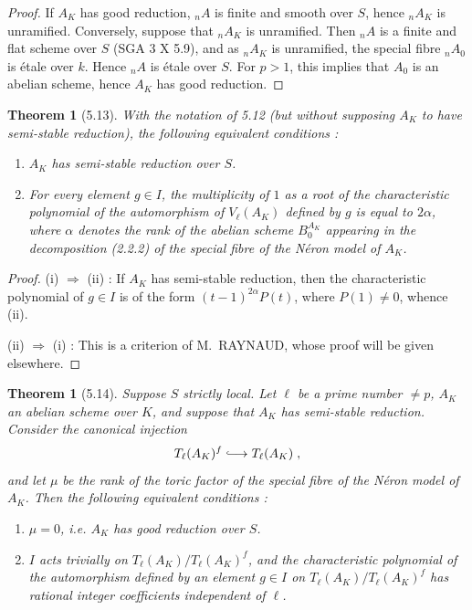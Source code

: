 \documentclass[11pt]{article}
\newtheorem{theoreme}[proposition]{Theorem}
\newcommand{\Tl}{T_{\ell}}
\begin{document}
\begin{proof}
If $A_K$ has good reduction, ${}_n A$ is finite and smooth over $S$, hence
${}_n A_K$ is unramified. Conversely, suppose that ${}_n A_K$ is
unramified. Then ${}_n A$ is a finite and flat scheme over $S$ (SGA 3 X
5.9), and as ${}_n A_K$ is unramified, the special fibre ${}_n A_0$ is
\'etale over $k$. Hence ${}_n A$ is \'etale over $S$. For $p > 1$, this
implies that $A_0$ is an abelian scheme, hence $A_K$ has good
reduction.
\end{proof}

\begin{theoreme}[5.13]
With the notation of \emph{5.12} (but without supposing $A_K$ to have
semi-stable reduction), the following equivalent conditions :
\begin{enumerate}[label=\emph{(\roman*)}]
\item $A_K$ has \emph{semi-stable reduction} over $S$.
\item For every element $g \in I$, the multiplicity of $1$ as a root
of the characteristic polynomial of the automorphism of
$V_{\ell}(A_K)$ defined by $g$ is equal to $2\alpha$, where $\alpha$
denotes the rank of the abelian scheme $B_0^{A_K}$ appearing in the
decomposition (2.2.2) of the special fibre of the N\'eron model of
$A_K$.
\end{enumerate}
\end{theoreme}

\begin{proof}
(i) $\Rightarrow$ (ii) : If $A_K$ has semi-stable reduction, then the
characteristic polynomial of $g \in I$ is of the form
$(t-1)^{2\alpha} P(t)$, where $P(1) \neq 0$, whence (ii).

(ii) $\Rightarrow$ (i) : This is a criterion of M.~RAYNAUD, whose
proof will be given elsewhere.
\end{proof}

\begin{theoreme}[5.14]
Suppose $S$ strictly local. Let $\ell$ be a prime number $\neq p$, $A_K$
an abelian scheme over $K$, and suppose that $A_K$ has semi-stable
reduction. Consider the canonical injection
\begin{equation}
\Tl(A_K)^f \lhook\joinrel\longrightarrow \Tl(A_K) \; ,
\end{equation}
and let $\mu$ be the rank of the toric factor of the special fibre of
the N\'eron model of $A_K$. Then the following equivalent conditions :
\begin{enumerate}[label=\emph{(\roman*)}]
\item $\mu = 0$, i.e. $A_K$ has \emph{good reduction} over $S$.
\item $I$ acts trivially on $\Tl(A_K)/\Tl(A_K)^f$, and the
characteristic polynomial of the automorphism defined by an element $g
\in I$ on $\Tl(A_K)/\Tl(A_K)^f$ has rational integer coefficients
independent of $\ell$.
\end{enumerate}
\end{theoreme}
\end{document}

